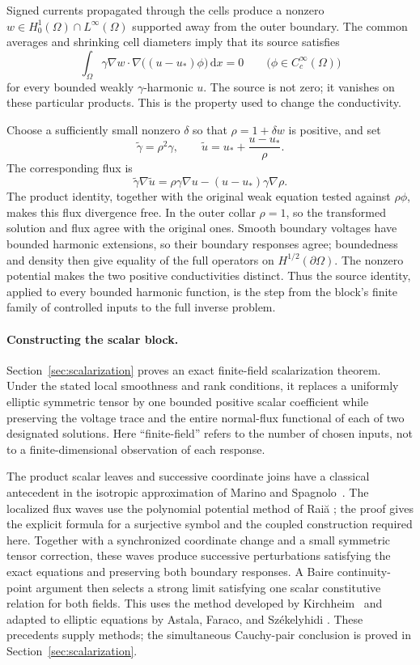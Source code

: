 \documentclass[11pt]{article}
\numberwithin{equation}{section}
\theoremstyle{definition}
\theoremstyle{remark}
\newcommand{\dd}{\,\mathrm d}
\begin{document}
Signed currents propagated through the cells produce a nonzero
$w\in H^1_0(\Omega)\cap L^\infty(\Omega)$ supported away from the
outer boundary. The common averages and shrinking cell diameters imply
that its source satisfies
\[
 \int_\Omega\gamma\nabla w\cdot
       \nabla\bigl((u-u_*)\phi\bigr)\dd x=0
 \qquad\bigl(\phi\in C_c^\infty(\Omega)\bigr)
\]
for every bounded weakly $\gamma$-harmonic $u$. The source is not zero;
it vanishes on these particular products. This is the property used
to change the conductivity.

Choose a sufficiently small nonzero $\delta$ so that $\rho=1+\delta w$
is positive, and set
\[
 \widetilde\gamma=\rho^2\gamma,
 \qquad
 \widetilde u=u_*+\frac{u-u_*}{\rho}.
\]
The corresponding flux is
\[
 \widetilde\gamma\nabla\widetilde u
 =\rho\gamma\nabla u-(u-u_*)\gamma\nabla\rho.
\]
The product identity, together with the original weak equation tested
against $\rho\phi$, makes this flux divergence free. In the outer collar
$\rho=1$, so the transformed solution and flux agree with the original
ones. Smooth boundary voltages have bounded harmonic extensions, so
their boundary responses agree; boundedness and density then give
equality of the full operators on $H^{1/2}(\partial\Omega)$. The
nonzero potential makes the two positive conductivities distinct. Thus
the source identity, applied to every bounded harmonic function, is the
step from the block's finite family of controlled inputs to the full
inverse problem.

\paragraph{Constructing the scalar block.}
Section~\ref{sec:scalarization} proves an exact finite-field
scalarization theorem. Under the stated local smoothness and rank
conditions, it replaces a uniformly elliptic symmetric tensor by one
bounded positive scalar coefficient while preserving the voltage trace
and the entire normal-flux functional of each of two designated
solutions. Here ``finite-field'' refers to the number of chosen inputs,
not to a finite-dimensional observation of each response.

The product scalar leaves and successive coordinate joins have a
classical antecedent in the isotropic approximation of Marino and
Spagnolo~\cite[\S3]{MarinoSpagnolo}. The localized flux waves use the
polynomial potential method of Rai\u a
\cite[Theorem~1 and \S2]{Raita}; the proof gives the explicit
formula for a surjective symbol and the coupled construction required
here. Together with a synchronized coordinate change and a small
symmetric tensor correction, these waves produce successive perturbations
satisfying the exact equations and preserving both boundary responses.
A Baire continuity-point argument then selects a strong limit satisfying
one scalar constitutive relation for both fields. This uses
the method developed by Kirchheim~\cite{Kirchheim} and adapted to
elliptic equations by Astala, Faraco, and Sz\'ekelyhidi
\cite[Lemmas~3.7--3.8]{AstalaFaracoSzekelyhidi}. These precedents
supply methods; the simultaneous Cauchy-pair conclusion is proved in
Section~\ref{sec:scalarization}.
\end{document}
